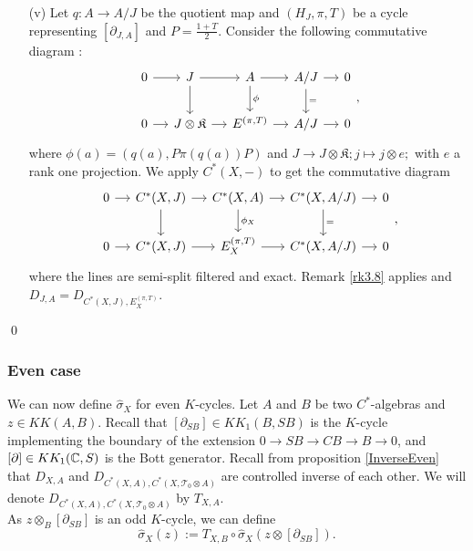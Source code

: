 \begin{dem}
\begin{enumerate}
\item[(v)] Let $q:A\rightarrow A/J$ be the quotient map and $(H_J, \pi, T)$ be a cycle representing $[\partial_{J,A}]$ and $P=\frac{1+T}{2}$. Consider the following commutative diagram :
\[\begin{tikzcd}[column sep = small]
0\arrow{r} &J\arrow{r}\arrow{d} & A \arrow{r}\arrow{d}{\phi}& A/J\arrow{r}\arrow{d}{=} & 0\\
0\arrow{r} & J\otimes \mathfrak K\arrow{r} & E^{(\pi,T)} \arrow{r}& A/J\arrow{r} & 0
\end{tikzcd},\]
where $\phi(a) = (q(a),P\pi(q(a))P)$ and $J\rightarrow J\otimes \mathfrak K; j\mapsto j\otimes e;$ with $e$ a rank one projection. We apply $C^*(X,-)$ to get the commutative diagram
\[\begin{tikzcd}[column sep = small]
0\arrow{r} & C^*(X,J)\arrow{r}\arrow{d} & C^*(X,A) \arrow{r}\arrow{d}{\phi_X}& C^*(X,A/J)\arrow{r}\arrow{d}{=} & 0\\
0\arrow{r} & C^*(X,J)\arrow{r} & E_X^{(\pi,T)} \arrow{r}& C^*(X,A/J)\arrow{r} & 0
\end{tikzcd},\]
where the lines are semi-split filtered and exact. Remark \ref{rk3.8} applies and $D_{J,A} = D_{C^*(X,J),E_X^{(\pi,T)}}$.\\
\end{enumerate}
\qed
\end{dem}

\subsubsection{Even case} %

We can now define $\hat\sigma_X$ for even $K$-cycles. Let $A$ and $B$ be two $C^*$-algebras and $z\in KK(A,B)$. Recall that $[\partial_{SB}]\in KK_1(B,SB)$ is the $K$-cycle implementing the boundary of the extension $0\rightarrow SB\rightarrow CB\rightarrow B\rightarrow 0$, and $[\partial]\in KK_1(\mathbb C,S)$ is the Bott generator. Recall from proposition \ref{InverseEven} that $D_{X,A}$  and $D_{ C^*(X,A),C^*(X,\mathcal T_0\otimes A) }$ are controlled inverse of each other. We will denote $D_{ C^*(X,A),C^*(X,\mathcal T_0\otimes A) }$ by $T_{X,A}$.\\

As $z\otimes_B [\partial_{SB}]$ is an odd $K$-cycle, we can define
\[\hat\sigma_X(z):= T_{X,B}\circ \hat\sigma_X(z\otimes[\partial_{SB}]).\] 

